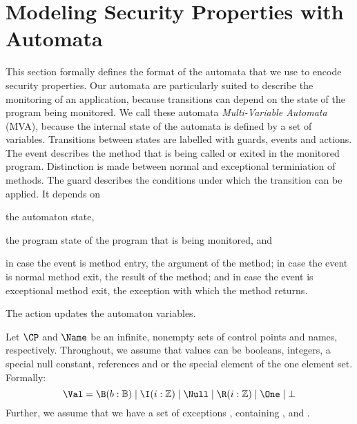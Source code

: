 \section{Modeling Security Properties with Automata}\label{SecMVA}

This section formally defines the format of the automata that we use
to encode security properties. Our automata are particularly suited to
describe the monitoring of an application, because transitions can
depend on the state of the program being monitored. We call these
automata \emph{Multi-Variable Automata} (MVA), because the internal
state of the automata is defined by a set of variables. Transitions
between states are labelled with guards, events and actions. The event
describes the method that is being called or exited in the monitored
program. Distinction is made between normal and exceptional
terminiation of methods. The guard describes the conditions under
which the transition can be applied. It depends on
\begin{inparaenum}
\item the automaton state,
\item the program state of the program that is being monitored, and
\item in case the event is method entry, the argument of the method;
in case the event is normal method exit, the result of the method; and
in case the event is exceptional method exit, the exception with which
the method returns.
\end{inparaenum}
The action updates the automaton variables.

Let \(\CP\) and \(\Name\) be an infinite, nonempty sets of control
points and names, respectively.  Throughout, we assume that values can
be booleans, integers, a special null constant, references and or the 
special element of the one element set. 
Formally:
\[\Val  =  \B(b : \mathbb{B}) \mid \I(i : \mathbb{Z}) \mid \Null \mid
\R(i : \mathbb{Z}) \mid \One \mid \bot
\]
Further, we assume that we have a set of exceptions \Excp, containing
\Throwable, \NullPointer and \JMLExc.


